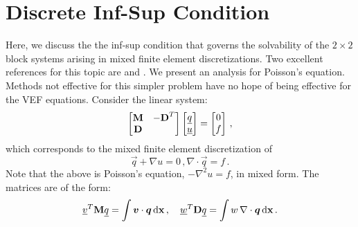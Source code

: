 \documentclass[../doc.tex]{subfiles}
\begin{document}
\section{Discrete Inf-Sup Condition} \label{rtvef_sec:infsup}
Here, we discuss the the inf-sup condition that governs the solvability of the $2\times 2$ block systems arising in mixed finite element discretizations. Two excellent references for this topic are \textcite{Brezzi2003StabilityOS} and \textcite{benzi_golub_liesen_2005}. We present an analysis for Poisson's equation. Methods not effective for this simpler problem have no hope of being effective for the VEF equations. Consider the linear system: 
	\begin{equation} \label{rtvef:block_sys}
		\begin{bmatrix} 
			\boldsymbol{\mathrm{M}} & -\boldsymbol{\mathrm{D}}^T \\ \boldsymbol{\mathrm{D}} 			
		\end{bmatrix}
		\begin{bmatrix} 
			\underline{q} \\ \underline{u} 
		\end{bmatrix}
		= \begin{bmatrix} 
			0 \\ f 
		\end{bmatrix} \,, 
	\end{equation}
which corresponds to the mixed finite element discretization of 
	\begin{subequations}
	\begin{equation}
		 \vec{q} + \nabla u = 0 \,,
	\end{equation}
	\begin{equation}
		\nabla\cdot\vec{q} = f \,. 
	\end{equation}
	\end{subequations}
Note that the above is Poisson's equation, $-\nabla^2 u = f$, in mixed form. The matrices are of the form:
	\begin{equation}
		\underline{v}^T\boldsymbol{\mathrm{M}} \underline{q} = \int \boldsymbol{v}\cdot\boldsymbol{q} \mathop{}\!\mathrm{d} \boldsymbol{\mathrm{x}} \,, \quad \underline{w}^T\boldsymbol{\mathrm{D}}\underline{q} = \int w\,\nabla\cdot\boldsymbol{q} \mathop{}\!\mathrm{d} \boldsymbol{\mathrm{x}} \,. 
	\end{equation}
\end{document}
